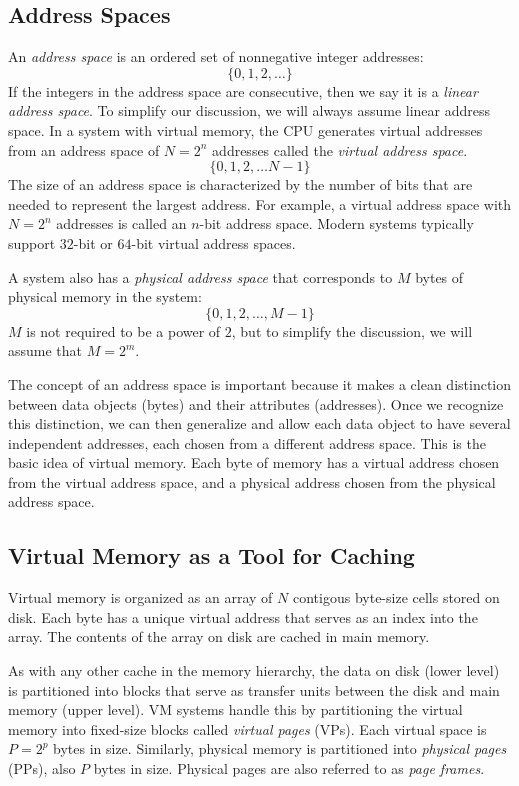 \documentclass[../main.tex]{subfiles}
\begin{document}


\subsection{Address Spaces}

An \textit{address space} is an ordered set of nonnegative integer addresses:
\[ \{0,1,2,\ldots\} \]
If the integers in the address space are consecutive, then we say it is a \textit{linear address space}. To simplify our discussion, we will always assume linear address space. In a system with virtual memory, the CPU generates virtual addresses from an address space of $N=2^n$ addresses called the \textit{virtual address space}.
\[ \{0,1,2,\ldots N-1\} \]
The size of an address space is characterized by the number of bits that are needed to represent the largest address. For example, a virtual address space with $N=2^n$ addresses is called an $n$-bit address space. Modern systems typically support $32$-bit or $64$-bit virtual address spaces.

A system also has a \textit{physical address space} that corresponds to $M$ bytes of physical memory in the system:
\[ \{0,1,2,\ldots,M-1\} \]
$M$ is not required to be a power of $2$, but to simplify the discussion, we will assume that $M=2^m$.

The concept of an address space is important because it makes a clean distinction between data objects (bytes) and their attributes (addresses). Once we recognize this distinction, we can then generalize and allow each data object to have several independent addresses, each chosen from a different address space. This is the basic idea of virtual memory. Each byte of memory has a virtual address chosen from the virtual address space, and a physical address chosen from the physical address space.

\subsection{Virtual Memory as a Tool for Caching}

Virtual memory is organized as an array of $N$ contigous byte-size cells stored on disk. Each byte has a unique virtual address that serves as an index into the array. The contents of the array on disk are cached in main memory. 

As with any other cache in the memory hierarchy, the data on disk (lower level) is partitioned into blocks that serve as transfer units between the disk and main memory (upper level). VM systems handle this by partitioning the virtual memory into fixed-size blocks called \textit{virtual pages} (VPs). Each virtual space is $P=2^p$ bytes in size. Similarly, physical memory is partitioned into \textit{physical pages} (PPs), also $P$ bytes in size. Physical pages are also referred to as \textit{page frames}.
\end{document}
